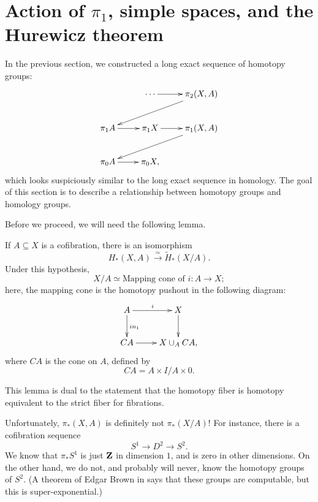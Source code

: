 \section{Action of $\pi_1$, simple spaces, and the Hurewicz theorem}
In the previous section, we constructed a long exact sequence of homotopy groups:
\begin{equation*}
    \xymatrix{
	& \cdots\ar[r] & \pi_2 (X,A)\ar[dll]\\
	\pi_1 A\ar[r] & \pi_1 X\ar[r] & \pi_1 (X,A)\ar[dll]\\
	\pi_0 A\ar[r] & \pi_0 X, & 
    }
\end{equation*}
which looks suspiciously similar to the long exact sequence in homology.
The goal of this section is to describe a relationship between homotopy groups and homology groups.

Before we proceed, we will need the following lemma.
\begin{lemma}[Excision]
    If $A\subseteq X$ is a cofibration, there is an isomorphism
    $$H_\ast(X,A)\xrightarrow{\simeq}\widetilde{H}_\ast(X/A).$$
    Under this hypothesis,
    $$X/A\simeq\text{Mapping cone of }i:A\to X;$$
    here, the mapping cone is the homotopy pushout in the following diagram:
    \begin{equation*}
	\xymatrix{
	    A\ar[r]^i\ar[d]^{in_1} & X\ar[d]\\
	    CA\ar[r] & X\cup_A CA,
	    }
    \end{equation*}
    where $CA$ is the cone on $A$, defined by
    $$CA = A\times I/A\times 0.$$
\end{lemma}
This lemma is dual to the statement that the homotopy fiber is homotopy equivalent to the strict fiber for fibrations.

Unfortunately, $\pi_\ast(X,A)$ is definitely not $\pi_\ast(X/A)$!
For instance, there is a cofibration sequence
$$S^1\to D^2\to S^2.$$
We know that $\pi_\ast S^1$ is just $\mathbf Z$ in dimension $1$, and is zero in other dimensions.
On the other hand, we do not, and probably will never, know the homotopy groups of $S^2$.
(A theorem of Edgar Brown in \cite{brown-computability} says that these groups are computable, but this is super-exponential.)

